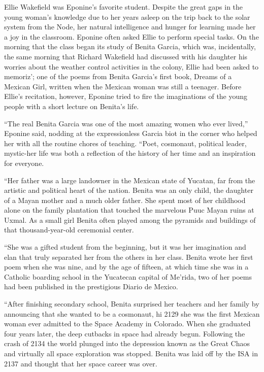 \documentclass[]{article}
\begin{document}
{Ellie Wakefield was Eponine’s favorite student. Despite the great gaps in the young woman’s knowledge due to her years asleep on the trip back to the solar system from the Node, her natural intelligence and hunger for learning made her a joy in the classroom. Eponine often asked Ellie to perform special tasks. On the morning that the class began its study of Benita Garcia, which was, incidentally, the same morning that Richard Wakefield had discussed with his daughter his worries about the weather control activities in the colony, Ellie had been asked to memoriz’; one of the poems from Benita Garcia’s first book, Dreams of a Mexican Girl, written when the Mexican woman was still a teenager. Before Ellie’s recitation, however, Eponine tried to fire the imaginations of the young people with a short lecture on Benita’s life.

“The real Benita Garcia was one of the most amazing women who ever lived,” Eponine said, nodding at the expressionless Garcia biot in the corner who helped her with all the routine chores of teaching. “Poet, cosmonaut, political leader, mystic-her life was both a reflection of the history of her time and an inspiration for everyone.

“Her father was a large landowner in the Mexican state of Yucatan, far from the artistic and political heart of the nation. Benita was an only child, the daughter of a Mayan mother and a much older father. She spent most of her childhood alone on the family plantation that touched the marvelous Puuc Mayan ruins at Uxmal. As a small girl Benita often played among the pyramids and buildings of that thousand-year-old ceremonial center.

“She was a gifted student from the beginning, but it was her imagination and elan that truly separated her from the others in her class. Benita wrote her first poem when she was nine, and by the age of fifteen, at which time she was in a Catholic boarding school in the Yucatecan capital of Me’rida, two of her poems had been published in the prestigious Diario de Mexico.

“After finishing secondary school, Benita surprised her teachers and her family by announcing that she wanted to be a cosmonaut, hi 2129 she was the first Mexican woman ever admitted to the Space Academy in Colorado. When she graduated four years later, the deep cutbacks in space had already begun. Following the crash of 2134 the world plunged into the depression known as the Great Chaos and virtually all space exploration was stopped. Benita was laid off by the ISA in 2137 and thought that her space career was over.

}
\end{document}

